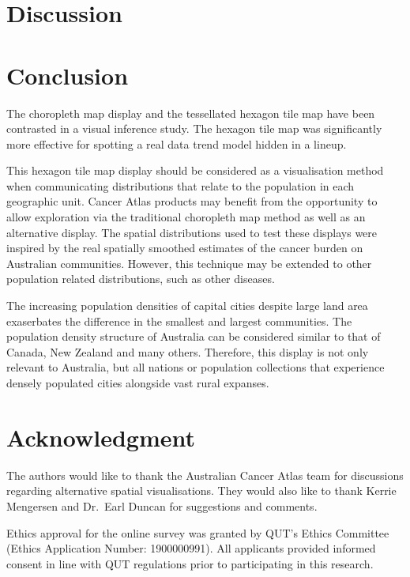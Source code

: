 \documentclass[conference,final,]{IEEEtran}
\begin{document}
\hypertarget{discussion}{%
\section{Discussion}\label{discussion}}

\hypertarget{conclusion}{%
\section{Conclusion}\label{conclusion}}

The choropleth map display and the tessellated hexagon tile map have been contrasted in a visual inference study.
The hexagon tile map was significantly more effective for spotting a real data trend model hidden in a lineup.

This hexagon tile map display should be considered as a visualisation method when communicating distributions that relate to the population in each geographic unit. Cancer Atlas products may benefit from the opportunity to allow exploration via the traditional choropleth map method as well as an alternative display. The spatial distributions used to test these displays were inspired by the real spatially smoothed estimates of the cancer burden on Australian communities. However, this technique may be extended to other population related distributions, such as other diseases.

The increasing population densities of capital cities despite large land area exaserbates the difference in the smallest and largest communities.
The population density structure of Australia can be considered similar to that of Canada, New Zealand and many others. Therefore, this display is not only relevant to Australia, but all nations or population collections that experience densely populated cities alongside vast rural expanses.

\hypertarget{acknowledgment}{%
\section{Acknowledgment}\label{acknowledgment}}

The authors would like to thank the Australian Cancer Atlas team for discussions regarding alternative spatial visualisations. They would also like to thank Kerrie Mengersen and Dr.~Earl Duncan for suggestions and comments.

Ethics approval for the online survey was granted by QUT's Ethics Committee (Ethics Application Number: 1900000991). All applicants provided informed consent in line with QUT regulations prior to participating in this research.
\end{document}
